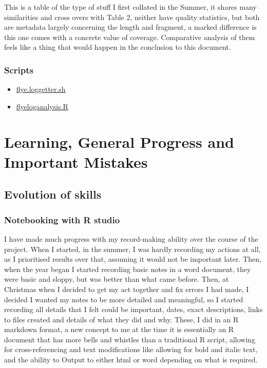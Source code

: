 \documentclass[
  letterpaper,
  DIV=11,
  numbers=noendperiod]{scrreprt}
\begin{document}
This is a table of the type of stuff I first collated in the Summer, it
shares many similarities and cross overs with Table 2, neither have
quality statistics, but both are metadata largely concerning the length
and fragment, a marked difference is this one comes with a concrete
value of coverage. Comparative analysis of them feels like a thing that
would happen in the conclusion to this document.

\subsection{Scripts}\label{scripts-6}

\begin{itemize}
\item
  \href{https://github.com/tobiasnunn/tnunn_research/blob/main/Research_Experience_Module/00_scripts/Slurmscripts/flye.loggetter.sh}{flye.loggetter.sh}
\item
  \href{https://github.com/tobiasnunn/tnunn_research/blob/main/Research_Experience_Module/00_scripts/Rscripts/flyeloganalysis.R}{flyeloganalysis.R}
\end{itemize}


\chapter{Learning, General Progress and Important
Mistakes}\label{sec-genprog}

\section{Evolution of skills}\label{evolution-of-skills}

\subsection{Notebooking with R studio}\label{notebooking-with-r-studio}

I have made much progress with my record-making ability over the course
of the project. When I started, in the summer, I was hardly recording my
actions at all, as I prioritised results over that, assuming it would
not be important later. Then, when the year began I started recording
basic notes in a word document, they were basic and sloppy, but was
better than what came before. Then, at Christmas when I decided to get
my act together and fix errors I had made, I decided I wanted my notes
to be more detailed and meaningful, so I started recording all details
that I felt could be important, dates, exact descriptions, links to
files created and details of what they did and why. These, I did in an R
markdown format, a new concept to me at the time it is essentially an R
document that has more bells and whistles than a traditional R script,
allowing for cross-referencing and text modifications like allowing for
bold and italic text, and the ability to Output to either html or word
depending on what is required.
\end{document}
